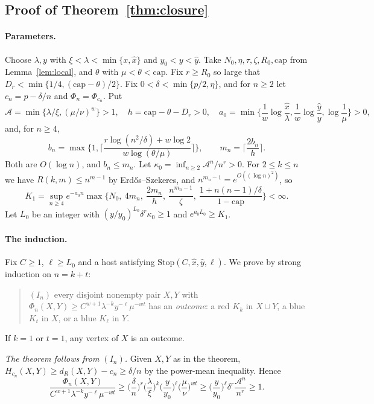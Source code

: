 \documentclass[11pt]{article}
\theoremstyle{definition}
\theoremstyle{remark}
\begin{document}
\subsection{Proof of Theorem~\ref{thm:closure}}

\paragraph{Parameters.} Choose $\lambda,y$ with $\xi<\lambda<\min\{x,\hat x\}$ and $y_0<y<\hat y$. Take
$N_0,\eta,\tau,\zeta,R_0,\mathrm{cap}$ from Lemma~\ref{lem:local}, and $\theta$ with $\mu<\theta<\mathrm{cap}$. Fix
$r\ge R_0$ so large that $D_r<\min\{1/4,(\mathrm{cap}-\theta)/2\}$. Fix $0<\delta<\min\{p/2,\eta\}$, and for $n\ge2$
let $c_n=p-\delta/n$ and $\Phi_n=\Phi_{c_n}$. Put
\[
\mathcal A=\min\{\lambda/\xi,(\mu/\nu)^w\}>1,\quad h=\mathrm{cap}-\theta-D_r>0,\quad
a_0=\min\Big\{\frac1w\log\frac{\hat x}\lambda,\frac1w\log\frac{\hat y}y,\log\frac1\mu\Big\}>0,
\]
and, for $n\ge4$,
\[
b_n=\max\Big\{1,\Big\lceil\frac{r\log(n^2/\delta)+w\log2}{w\log(\theta/\mu)}\Big\rceil\Big\},\qquad
m_n=\Big\lceil\frac{2b_n}h\Big\rceil.
\]
Both are $O(\log n)$, and $b_n\le m_n$. Let $\kappa_0=\inf_{n\ge2}\mathcal A^n/n^r>0$. For $2\le k\le n$ we have
$R(k,m)\le n^{m-1}$ by Erd\H{o}s--Szekeres, and $n^{m_n-1}=e^{O((\log n)^2)}$, so
\[
K_1=\sup_{n\ge4}e^{-a_0n}\max\Big\{N_0,\ 4m_n,\ \frac{2m_n}h,\ \frac{n^{m_n-1}}\zeta,\
\frac{1+n(n-1)/\delta}{1-\mathrm{cap}}\Big\}<\infty.
\]
Let $L_0$ be an integer with $(y/y_0)^{L_0}\delta^r\kappa_0\ge1$ and $e^{a_0L_0}\ge K_1$.

\paragraph{The induction.} Fix $C\ge1$, $\ell\ge L_0$ and a host satisfying $\mathrm{Stop}(C,\hat x,\hat y,\ell)$. We
prove by strong induction on $n=k+t$:
\begin{quote}
$(I_n)$ every disjoint nonempty pair $X,Y$ with $\Phi_n(X,Y)\ge C^{w+1}\lambda^{-k}y^{-\ell}\mu^{-wt}$ has an
\emph{outcome}: a red $K_k$ in $X\cup Y$, a blue $K_t$ in $X$, or a blue $K_\ell$ in $Y$.
\end{quote}
If $k=1$ or $t=1$, any vertex of $X$ is an outcome.

\emph{The theorem follows from $(I_n)$.} Given $X,Y$ as in the theorem, $H_{c_n}(X,Y)\ge d_R(X,Y)-c_n\ge\delta/n$ by the
power-mean inequality. Hence
\[
\frac{\Phi_n(X,Y)}{C^{w+1}\lambda^{-k}y^{-\ell}\mu^{-wt}}\ge\Big(\frac\delta n\Big)^r\Big(\frac\lambda\xi\Big)^k
\Big(\frac y{y_0}\Big)^\ell\Big(\frac\mu\nu\Big)^{wt}\ge\Big(\frac y{y_0}\Big)^\ell\delta^r\frac{\mathcal A^n}{n^r}\ge1.
\]
\end{document}

